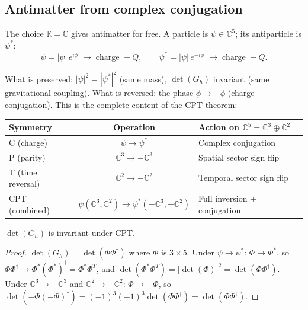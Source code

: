 \subsection{Antimatter from complex conjugation}

The choice $\mathbb{K} = \mathbb{C}$ gives antimatter for free. A particle is $\psi \in \mathbb{C}^5$; its antiparticle is $\psi^*$:
\begin{equation}
\psi = |\psi|\,e^{i\phi} \;\to\; \text{charge } +Q, \qquad \psi^* = |\psi|\,e^{-i\phi} \;\to\; \text{charge } -Q.
\end{equation}

What is preserved: $|\psi|^2 = |\psi^*|^2$ (same mass), $\det(G_h)$ invariant (same gravitational coupling). What is reversed: the phase $\phi \to -\phi$ (charge conjugation). This is the complete content of the CPT theorem:

\begin{center}
\begin{tabular}{lcl}
\hline
Symmetry & Operation & Action on $\mathbb{C}^5 = \mathbb{C}^3 \oplus \mathbb{C}^2$ \\
\hline
C (charge) & $\psi \to \psi^*$ & Complex conjugation \\
P (parity) & $\mathbb{C}^3 \to -\mathbb{C}^3$ & Spatial sector sign flip \\
T (time reversal) & $\mathbb{C}^2 \to -\mathbb{C}^2$ & Temporal sector sign flip \\
\hline
CPT (combined) & $\psi(\mathbb{C}^3, \mathbb{C}^2) \to \psi^*(-\mathbb{C}^3, -\mathbb{C}^2)$ & Full inversion + conjugation \\
\hline
\end{tabular}
\end{center}

\begin{theorem}
$\det(G_h)$ is invariant under CPT.
\end{theorem}

\begin{proof}
$\det(G_h) = \det(\Phi\Phi^\dagger)$ where $\Phi$ is $3 \times 5$. Under $\psi \to \psi^*$: $\Phi \to \Phi^*$, so $\Phi\Phi^\dagger \to \Phi^*(\Phi^*)^\dagger = \Phi^*\Phi^T$, and $\det(\Phi^*\Phi^T) = |\det(\Phi)|^2 = \det(\Phi\Phi^\dagger)$. Under $\mathbb{C}^3 \to -\mathbb{C}^3$ and $\mathbb{C}^2 \to -\mathbb{C}^2$: $\Phi \to -\Phi$, so $\det(-\Phi(-\Phi)^\dagger) = (-1)^3(-1)^3\det(\Phi\Phi^\dagger) = \det(\Phi\Phi^\dagger)$.
\end{proof}

